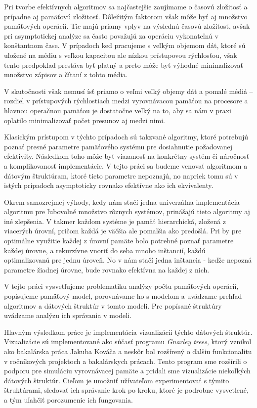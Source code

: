 
Pri tvorbe efektívnych algoritmov sa najčastejšie zaujímame o časovú zložitosť a prípadne aj pamäťovú zložitosť. Dôležitým faktorom však môže byť aj množstvo pamäťových operácií. Tie majú priamy vplyv na výslednú časovú zložitosť, avšak pri asymptotickej analýze sa často považujú za operáciu vykonateľnú v konštantnom čase. V prípadoch keď pracujeme s veľkým objemom dát, ktoré sú uložené na médiu s veľkou kapacitou ale nízkou prístupovou rýchlosťou, však tento predpoklad prestáva byť platný a preto môže byť výhodné minimalizovať množstvo zápisov a čítaní z tohto média. 

V skutočnosti však nemusí ísť priamo o veľmi veľký objemy dát a pomalé médiá -- rozdiel v prístupových rýchlostiach medzi vyrovnávacou pamäťou na procesore a hlavnou operačnou pamäťou je dostatočne veľký na to, aby sa nám v praxi oplatilo minimalizovať počet presunov aj medzi nimi.

Klasickým prístupom v týchto prípadoch sú takzvané \aware algoritmy, ktoré potrebujú poznať presné parametre pamäťového systému pre dosiahnutie požadovanej efektivity. Následkom toho môže byť viazanosť na konkrétny systém či náročnosť a komplikovanosť implementácie. V tejto práci sa budeme venovať \obliv algoritmom a dátovým štruktúram, ktoré tieto parametre nepoznajú, no napriek tomu sú v istých prípadoch asymptoticky rovnako efektívne ako ich \aware ekvivalenty.

Okrem samozrejmej výhody, kedy nám stačí jedna univerzálna implementácia algoritmu pre ľubovolné množstvo rôznych systémov, prinášajú tieto algoritmy aj iné zlepšenia. V takmer každom systéme je pamäť hierarchická, zložená z viacerých úrovní, pričom každá je väčšia ale pomalšia ako predošlá. Pri \aware by pre optimálne využitie každej z úrovní pamäte bolo potrebné poznať parametre každej úrovne, a rekurzívne vnoriť do seba mnoho inštancií, každú optimalizovanú pre jednu úroveň. No v \obliv nám stačí jedna inštancia - keďže nepozná parametre žiadnej úrovne, bude rovnako efektívna na každej z nich.

V tejto práci vysvetľujeme problematiku analýzy počtu pamäťových operácií, popisujeme \obliv pamäťový model, porovnávame ho s \aware modelom a uvádzame prehľad algoritmov a dátových štruktúr v tomto modeli. Pre popísané štruktúry uvádzame analýzu ich správania v \obliv modeli.

Hlavným výsledkom práce je implementácia vizualizácií týchto dátových štruktúr. Vizualizácie sú implementované ako súčasť programu {\em Gnarley trees}, ktorý vznikol ako bakalárska práca Jakuba Kováča a neskôr bol rozšírený o ďalšiu funkcionalitu v ročníkových projektoch a bakalárskych prácach. Tento program sme rozšírili o podporu pre simuláciu vyrovnávacej pamäte a pridali sme vizualizácie niekoľkých \obliv dátových štruktúr. Cieľom je umožniť užívateľom experimentovať s týmito štruktúrami, sledovať ich správanie krok po kroku, ktoré je podrobne vysvetlené, a tým uľahčiť porozumenie ich fungovania. 